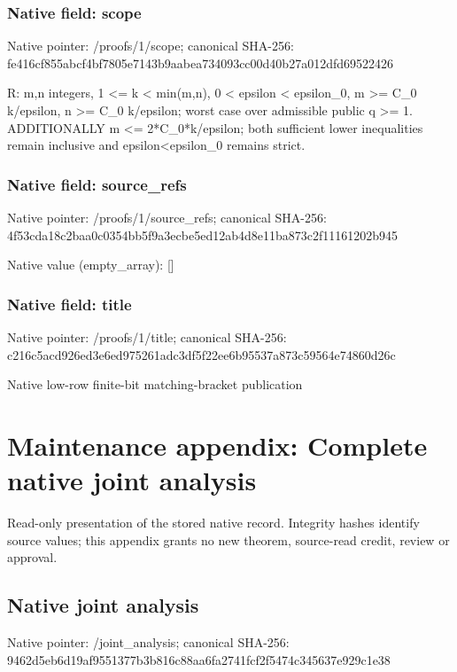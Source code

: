 \documentclass[10pt,a4paper]{article}
\begin{document}
\subsubsection{Native field: scope}
Native pointer: /proofs/1/scope; canonical SHA-256: fe416cf855abcf4bf7805e7143b9aabea734093cc00d40b27a012dfd69522426

\begingroup\raggedright\sloppy R:\allowbreak{} m,\allowbreak{}n integers,\allowbreak{} 1 <=\allowbreak{} k < min(m,\allowbreak{}n),\allowbreak{} 0 < epsilon < epsilon\_\allowbreak{}0,\allowbreak{} m >=\allowbreak{} C\_\allowbreak{}0 k/\allowbreak{}epsilon,\allowbreak{} n >=\allowbreak{} C\_\allowbreak{}0 k/\allowbreak{}epsilon;\allowbreak{} worst case over admissible public q >=\allowbreak{} 1. ADDITIONALLY m <=\allowbreak{} 2*C\_\allowbreak{}0*k/\allowbreak{}epsilon;\allowbreak{} both sufficient lower inequalities remain inclusive and epsilon<epsilon\_\allowbreak{}0 remains strict.\par\endgroup

\subsubsection{Native field: source\_\allowbreak{}refs}
Native pointer: /proofs/1/source\_\allowbreak{}refs; canonical SHA-256: 4f53cda18c2baa0c0354bb5f9a3ecbe5ed12ab4d8e11ba873c2f11161202b945

Native value (empty\_\allowbreak{}array): []

\subsubsection{Native field: title}
Native pointer: /proofs/1/title; canonical SHA-256: c216c5acd926ed3e6ed975261adc3df5f22ee6b95537a873c59564e74860d26c

\begingroup\raggedright\sloppy Native low-row finite-bit matching-bracket publication\par\endgroup

\section{Maintenance appendix: Complete native joint analysis}
Read-only presentation of the stored native record. Integrity hashes identify source values; this appendix grants no new theorem, source-read credit, review or approval.

\subsection{Native joint analysis}
Native pointer: /joint\_\allowbreak{}analysis; canonical SHA-256: 9462d5eb6d19af9551377b3b816c88aa6fa2741fcf2f5474c345637e929c1e38
\end{document}
